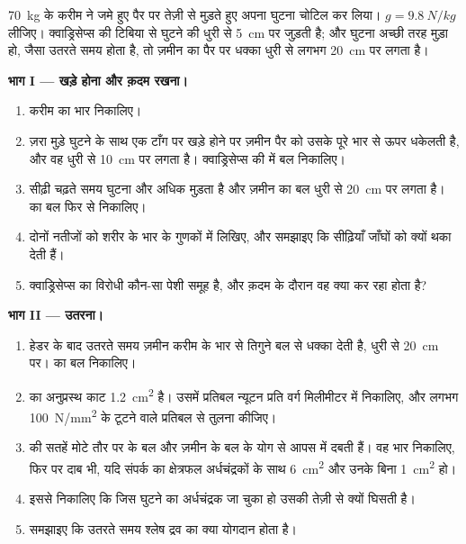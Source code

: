 \begin{problem}
\label{pb:g10:muscles-and-joints:1}
\qty{70}{kg} के करीम ने जमे हुए पैर पर तेज़ी से मुड़ते हुए अपना घुटना
चोटिल कर लिया। $g = \qty{9.8}{N/kg}$ लीजिए। क्वाड्रिसेप्स की 
टिबिया से घुटने की धुरी से \qty{5}{cm} पर जुड़ती है; और घुटना अच्छी तरह
मुड़ा हो, जैसा उतरते समय होता है, तो ज़मीन का पैर पर धक्का धुरी से लगभग
\qty{20}{cm} पर लगता है।

\medskip
\noindent\textbf{भाग I --- खड़े होना और क़दम रखना।}
\begin{enumerate}
  \item करीम का भार निकालिए।
  \item ज़रा मुड़े घुटने के साथ एक टाँग पर खड़े होने पर ज़मीन पैर को
        उसके पूरे भार से ऊपर धकेलती है, और वह धुरी से \qty{10}{cm} पर
        लगता है। क्वाड्रिसेप्स की  में बल निकालिए।
  \item सीढ़ी चढ़ते समय घुटना और अधिक मुड़ता है और ज़मीन का बल धुरी से
        \qty{20}{cm} पर लगता है।  का बल फिर से निकालिए।
  \item दोनों नतीजों को शरीर के भार के गुणकों में लिखिए, और समझाइए कि
        सीढ़ियाँ जाँघों को क्यों थका देती हैं।
  \item क्वाड्रिसेप्स का विरोधी कौन-सा पेशी समूह है, और क़दम के दौरान वह
        क्या कर रहा होता है?
\end{enumerate}

\medskip
\noindent\textbf{भाग II --- उतरना।}
\begin{enumerate}[resume]
  \item हेडर के बाद उतरते समय ज़मीन करीम के भार से तिगुने बल से धक्का
        देती है, धुरी से \qty{20}{cm} पर।  का बल निकालिए।
  \item {} का अनुप्रस्थ काट \qty{1.2}{cm^2} है। उसमें प्रतिबल न्यूटन
        प्रति वर्ग मिलीमीटर में निकालिए, और लगभग \qty{100}{N/mm^2} के
        टूटने वाले प्रतिबल से तुलना कीजिए।
  \item {} की सतहें मोटे तौर पर  के बल और ज़मीन के बल के योग से
        आपस में दबती हैं। वह भार निकालिए, फिर  पर दाब भी, यदि
        संपर्क का क्षेत्रफल अर्धचंद्रकों के साथ \qty{6}{cm^2} और उनके
        बिना \qty{1}{cm^2} हो।
  \item इससे निकालिए कि जिस घुटने का अर्धचंद्रक जा चुका हो उसकी 
        तेज़ी से क्यों घिसती है।
  \item समझाइए कि उतरते समय श्लेष द्रव का क्या योगदान होता है।
\end{enumerate}


\end{problem}
